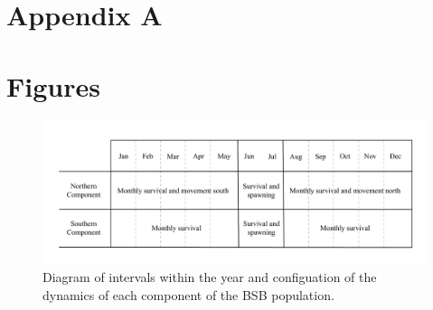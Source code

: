 \documentclass[
]{article}
\begin{document}
\pagebreak

\hypertarget{appendix-a}{%
\section*{Appendix A}\label{appendix-a}}

\setcounter{table}{0}
\renewcommand\thetable{A\arabic{table}}


\pagebreak

\hypertarget{figures}{%
\section*{Figures}\label{figures}}

\begin{figure}

{\centering \includegraphics[width=0.8\linewidth]{bsb_movement_diagram} 

}

\caption{Diagram of intervals within the year and configuation of the dynamics of each component of the BSB population.}\label{fig:migration-diagram}
\end{figure}
\pagebreak
\end{document}
